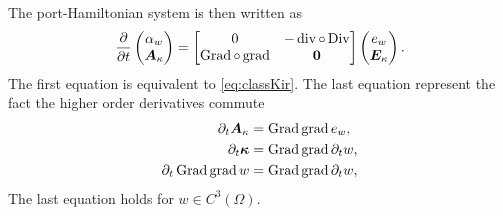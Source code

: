 The port-Hamiltonian system is then written as
\begin{equation}
\diffp{}{t}
\begin{pmatrix}
\alpha_w \\
\bm{A}_{\kappa} \\
\end{pmatrix} = 
\begin{bmatrix}
	0  &  - \div \circ \Div \\
	\Grad \circ \grad & \bm{0} \\
	\end{bmatrix}
\begin{pmatrix}
e_w \\
\bm{E}_{\kappa} \\
\end{pmatrix}.
\end{equation}
The first equation is equivalent to \eqref{eq:classKir}. The last equation represent the fact the higher order derivatives commute
\begin{align*}
\partial_t \bm{A}_{\kappa} &= \operatorname*{Grad}\operatorname*{grad} e_w, \\
\partial_t \bm{\kappa} &= \operatorname*{Grad}\operatorname*{grad} \partial_t w, \\
\partial_t \operatorname*{Grad}\operatorname*{grad} w  &= \operatorname*{Grad}\operatorname*{grad} \partial_t w, \\
\end{align*}
The last equation holds for $w \in C^3(\Omega)$.
